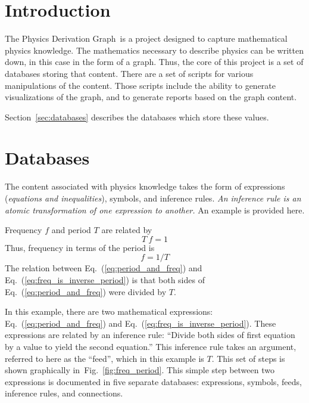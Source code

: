\documentclass{article}
\newcommand{\eqn}[1]{Eq.\ (\ref{#1})}
\newcommand{\pdg}{Physics Derivation Graph}
\begin{document}
\begin{multicols}{2}



\section{Introduction}

The \pdg\ is a project designed to capture mathematical physics knowledge. The mathematics necessary to describe physics can be written down, in this case in the form of a graph. Thus, the core of this project is a set of databases storing that content. There are a set of scripts for various manipulations of the content. Those scripts include the ability to generate visualizations of the graph, and to generate reports based on the graph content.

 Section~\ref{sec:databases} describes the databases which store these values. 

\section{Databases\label{sec:databases}}

The content associated with physics knowledge takes the form of expressions (\textit{equations and inequalities}), symbols, and inference rules. \textit{An inference rule is an atomic transformation of one expression to another.} An example is provided here. 

Frequency $f$ and period $T$ are related by
\begin{equation}
T\ f = 1
\label{eq:period_and_freq}
\end{equation}
Thus, frequency in terms of the period is
\begin{equation}
f = 1/T
\label{eq:freq_is_inverse_period}
\end{equation}
The relation between \eqn{eq:period_and_freq} and \eqn{eq:freq_is_inverse_period} is that both sides of \eqn{eq:period_and_freq} were divided by $T$. 

In this example, there are two mathematical expressions: \eqn{eq:period_and_freq} and \eqn{eq:freq_is_inverse_period}. These expressions are related by an inference rule: ``Divide both sides of first equation by a value to yield the second equation.'' This inference rule takes an argument, referred to here as the ``feed'', which in this example is $T$. This set of steps is shown graphically in~Fig.~\ref{fig:freq_period}. This simple step between two expressions is documented in five separate databases: expressions, symbols, feeds, inference rules, and connections. 


\end{multicols}
\end{document}
